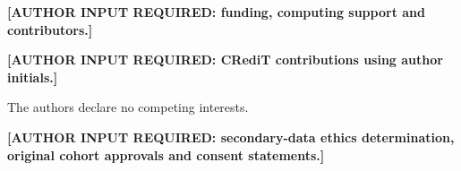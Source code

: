 \documentclass[pdflatex,sn-nature]{sn-jnl}
\begin{document}
\backmatter

\textbf{[AUTHOR INPUT REQUIRED: funding, computing support and contributors.]}

\textbf{[AUTHOR INPUT REQUIRED: CRediT contributions using author initials.]}

The authors declare no competing interests.

\textbf{[AUTHOR INPUT REQUIRED: secondary-data ethics determination, original cohort approvals and consent statements.]}


\end{document}
